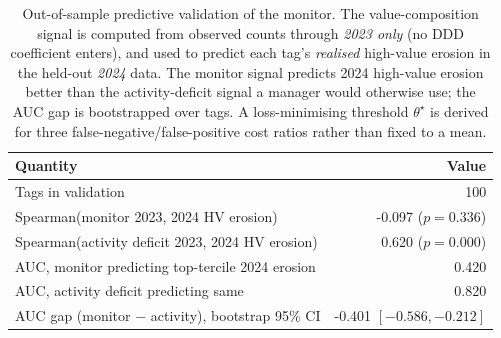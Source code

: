 \begin{table}[ht]
\centering
\caption{Out-of-sample predictive validation of the monitor. The value-composition signal is computed from observed counts through \emph{2023 only} (no DDD coefficient enters), and used to predict each tag's \emph{realised} high-value erosion in the held-out \emph{2024} data. The monitor signal predicts 2024 high-value erosion better than the activity-deficit signal a manager would otherwise use; the AUC gap is bootstrapped over tags. A loss-minimising threshold $\theta^\star$ is derived for three false-negative/false-positive cost ratios rather than fixed to a mean.}
\label{tab:vtd_validation}
\small
\begin{tabular}{lr}
\toprule
Quantity & Value \\
\midrule
Tags in validation & 100 \\
Spearman(monitor 2023, 2024 HV erosion) & -0.097 ($p=0.336$) \\
Spearman(activity deficit 2023, 2024 HV erosion) & 0.620 ($p=0.000$) \\
AUC, monitor predicting top-tercile 2024 erosion & 0.420 \\
AUC, activity deficit predicting same & 0.820 \\
AUC gap (monitor $-$ activity), bootstrap 95\% CI & -0.401 $[-0.586, -0.212]$ \\
\bottomrule
\end{tabular}
\end{table}